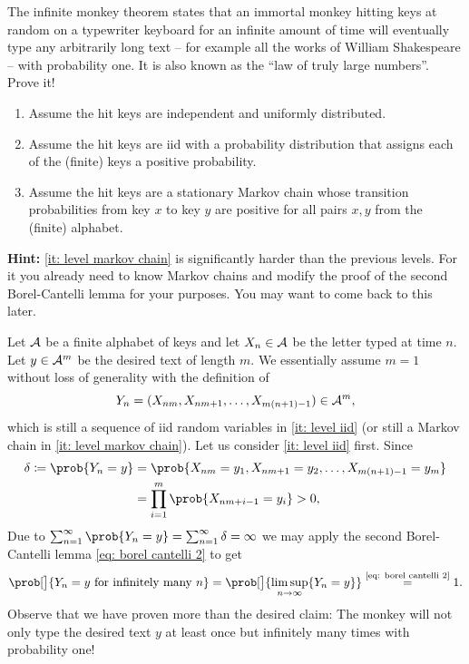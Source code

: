 \begin{exercise}
    The infinite monkey theorem states that an immortal monkey hitting keys at
    random on a typewriter keyboard for an infinite amount of time will
    eventually type any arbitrarily long text -- for example all the
    works of William Shakespeare -- with probability one.  It is also known as
    the ``law of truly large numbers''.
    Prove it!
    \begin{enumerate}[label={\emph{Level \arabic*:}},ref={Level \arabic*},leftmargin=4em,noitemsep]
        \item Assume the hit keys are independent and uniformly distributed.
        \item\label{it: level iid} Assume the hit keys are iid with a probability distribution that
        assigns each of the (finite) keys a positive probability.
        \item\label{it: level markov chain} Assume the hit keys are a stationary Markov chain whose transition
        probabilities from key \(x\) to key \(y\) are positive for all pairs
        \(x,y\) from the (finite) alphabet.
    \end{enumerate}
    \textbf{Hint:} \ref{it: level markov chain} is significantly harder than
    the previous levels. For it you already need to know Markov chains
    and modify the proof of the second Borel-Cantelli lemma for your purposes.
    You may want to come back to this later.
    \begin{solution}
        Let \(\mathcal{A}\) be a finite alphabet of keys and let \(X_n\in
        \mathcal{A}\) be the letter typed at time \(n\). Let \(y\in \mathcal{A}^m\)
        be the desired text of length \(m\). We essentially assume \(m=1\)
        without loss of generality with the definition of
        \[
            Y_n = (X_{nm}, X_{nm+1}, \ldots, X_{m(n+1)-1}) \in \mathcal{A}^m,
        \]
        which is still a sequence of iid random variables in \ref{it: level iid}
        (or still a Markov chain in \ref{it: level markov chain}).  Let us consider \ref{it: level iid}
        first. Since
        \[\begin{aligned}
            \delta \coloneq \prob{Y_n = y}
            &= \prob{X_{nm} = y_1, X_{nm+1} = y_2, \ldots, X_{m(n+1)-1} = y_m}
            \\
            &= \prod_{i=1}^m \prob{X_{nm+i-1} = y_i} > 0,
        \end{aligned}
        \]
        Due to \(\sum_{n=1}^\infty \prob{Y_n = y} = \sum_{n=1}^\infty \delta = \infty\)
        we may apply the second Borel-Cantelli lemma \eqref{eq: borel cantelli 2} to get
        \[
            \prob[\big]{Y_n = y \text{ for infinitely many } n}
            = \prob[\big]{\limsup_{n\to\infty} \set{Y_n = y}}
            \overset{\text{\eqref{eq: borel cantelli 2}}}= 1.
        \]
        Observe that we have proven more than the desired claim: The monkey will
        not only type the desired text \(y\) at least once but infinitely many
        times with probability one!


\end{solution}
\end{exercise}
